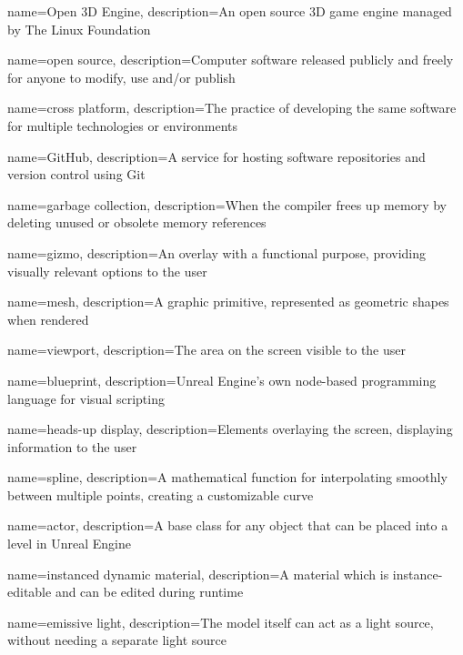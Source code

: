 {
    name=Open 3D Engine,
    description={An open source 3D game engine managed by The Linux Foundation}
}

{
    name=open source,
    description={Computer software released publicly and freely for anyone to modify, use and/or publish}
}

{
    name=cross platform,
    description={The practice of developing the same software for multiple technologies or environments}
}

{
    name=GitHub,
    description={A service for hosting software repositories and version control using Git}
}

{
    name=garbage collection,
    description={When the compiler frees up memory by deleting unused or obsolete  memory references}
}

{
    name=gizmo,
    description={An overlay with a functional purpose, providing visually relevant options to the user}
}

{
    name=mesh,
    description={A graphic primitive, represented as geometric shapes when rendered}
}

{
    name=viewport,
    description={The area on the screen visible to the user}
}

{
    name=blueprint,
    description={Unreal Engine's own node-based programming language for visual scripting}
}

{
    name=heads-up display,
    description={Elements overlaying the screen, displaying information to the user}
}

{
    name=spline,
    description={A mathematical function for interpolating smoothly between multiple points, creating a customizable curve}
}

{
    name=actor,
    description={A base class for any object that can be placed into a level in Unreal Engine}
}

{
    name=instanced dynamic material,
    description={A material which is instance-editable and can be edited during runtime}
}

{
    name=emissive light,
    description={The model itself can act as a light source, without needing a separate light source}
}

